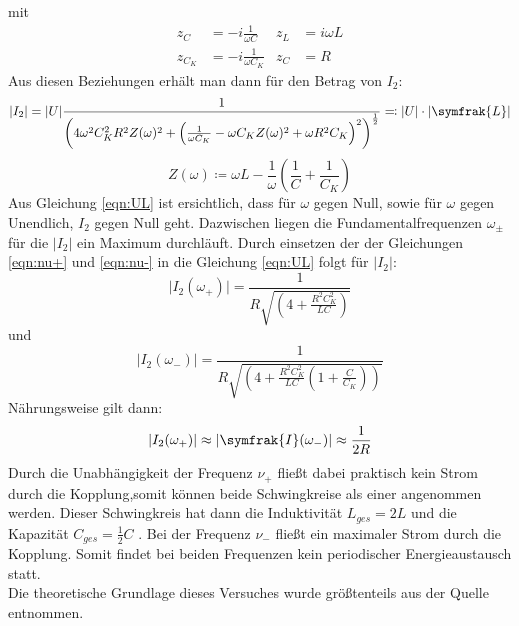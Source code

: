   mit
  \begin{align*}
    z_C & =  -i \frac{1}{\omega C} & z_L & =  i\omega L \\
    z_{C_K} & = -i \frac{1}{\omega C_K} &  z_C & =  R
  \end{align*}
Aus diesen Beziehungen erhält man dann für den Betrag von $I_2$:
\begin{equation}
  \lvert I_2 \rvert = \lvert U \rvert \frac{1}{\left( 4\omega^2 C_{K}^2 R^2 Z(\omega)^2 + \left( \frac{1}{\omega C_K}-\omega C_K Z(\omega)^2 + \omega R^2 C_K\right)^2 \right)^{\frac{1}{2}}}
  \eqcolon \lvert U \rvert \cdot \lvert \symfrak{L} \rvert
  \label{eqn:UL}
\end{equation}
\begin{equation*}
Z(\omega) \coloneq  \omega L - \frac{1}{\omega}\left(\frac{1}{C} + \frac{1}{C_K} \right)
\end{equation*}
Aus Gleichung \eqref{eqn:UL} ist ersichtlich, dass für $\omega$ gegen Null, sowie für $\omega$ gegen Unendlich, $I_2$ gegen Null geht. Dazwischen liegen die Fundamentalfrequenzen $\omega_{\pm}$ für
die $\lvert I_2 \rvert $ ein Maximum durchläuft. Durch einsetzen der der Gleichungen \eqref{eqn:nu+} und \eqref{eqn:nu-} in die Gleichung \eqref{eqn:UL} folgt für
$\lvert I_2 \rvert $:
\begin{equation}
  \lvert I_2(\omega_+) \rvert = \frac{1}{R \sqrt{\left(4 + \frac{R^2 C_{K}^2}{LC}\right)}}
  \label{eqn:Io+}
\end{equation}
und
\begin{equation}
  \lvert I_2(\omega_-) \rvert = \frac{1}{R \sqrt{\left(4 + \frac{R^2 C_{K}^2}{LC}\left(1+ \frac {C}{C_K}\right)\right)}}
  \label{eqn:Io-}
\end{equation}
Nährungsweise gilt dann:
\begin{equation*}
  \lvert I_2(\omega_+) \rvert \approx \lvert \symfrak{I}(\omega_-) \rvert \approx \frac{1}{2R}
\end{equation*}
Durch die Unabhängigkeit der Frequenz $ \nu_+ $ fließt dabei praktisch kein Strom durch die Kopplung,somit können beide Schwingkreise als einer angenommen werden.
Dieser Schwingkreis hat dann die Induktivität $L_{ges} = 2L $ und die Kapazität $ C_{ges} = \frac{1}{2} C $ . Bei der Frequenz $\nu_-$ fließt ein maximaler Strom
durch die Kopplung. Somit findet bei beiden Frequenzen kein periodischer Energieaustausch statt. \\
Die theoretische Grundlage dieses Versuches wurde größtenteils aus der Quelle \cite{sample} entnommen.
